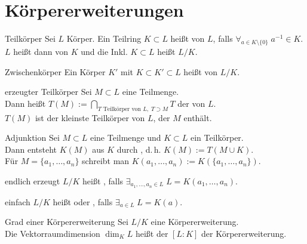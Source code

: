 \section{%
    Körpererweiterungen%
}

\begin{Def}{Teilkörper}
    Sei $L$ Körper.
    Ein Teilring $K \subset L$ heißt  von $L$,
    falls
    $\forall_{a \in K \setminus \{0\}}\; a^{-1} \in K$.\\
    $L$ heißt dann  von $K$
    und die Inkl. $K \subset L$ heißt  $L/K$.
\end{Def}

\begin{Def}{Zwischenkörper}
    Ein Körper $K'$ mit $K \subset K' \subset L$ heißt 
    von $L/K$.
\end{Def}

\begin{Def}{erzeugter Teilkörper}
    Sei $M \subset L$ eine Teilmenge.\\
    Dann heißt $T(M) := \bigcap_{T \text{ Teilkörper von } L,\; T \supset M} T$
    der  von $L$.\\
    $T(M)$ ist der kleinste Teilkörper von $L$, der $M$ enthält.
\end{Def}

\begin{Def}{Adjunktion}
    Sei $M \subset L$ eine Teilmenge und $K \subset L$ ein Teilkörper.\\
    Dann entsteht $K(M)$ aus $K$ durch , d.\,h.
    $K(M) := T(M \cup K)$.\\
    Für $M = \{a_1, \dotsc, a_n\}$ schreibt man
    $K(a_1, \dotsc, a_n) := K(\{a_1, \dotsc, a_n\})$.
\end{Def}

\begin{Def}{endlich erzeugt}
    $L/K$ heißt , falls
    $\exists_{a_1, \dotsc, a_n \in L}\; L = K(a_1, \dotsc, a_n)$.
\end{Def}

\begin{Def}{einfach}
    $L/K$ heißt  oder , falls
    $\exists_{a \in L}\; L = K(a)$.
\end{Def}

\linie

\begin{Def}{Grad einer Körpererweiterung}
    Sei $L/K$ eine Körpererweiterung.\\
    Die Vektorraumdimension $\dim_K L$ heißt der  $[L:K]$
    der Körpererweiterung.
\end{Def}

